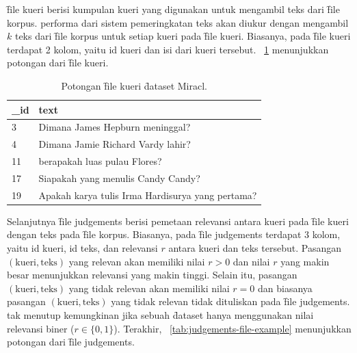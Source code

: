     \f{file} kueri berisi kumpulan kueri yang digunakan untuk mengambil teks dari \f{file} korpus. 
    performa dari sistem pemeringkatan teks akan diukur dengan mengambil $k$ teks dari \f{file} korpus untuk setiap kueri pada \f{file} kueri. Biasanya, pada \f{file} kueri terdapat 2 kolom, yaitu id kueri dan isi dari kueri tersebut. \tab~\ref{tab:query-file-example} menunjukkan potongan dari \f{file} kueri.
    \begin{table}
        \centering
        \caption{Potongan \f{file} kueri \f{dataset} Miracl.}
        \label{tab:query-file-example}
        \begin{tabular}{|l|p{}|}
            \hline
            \textbf{\_id} & \textbf{text}                                                                 \\ \hline
            3             & Dimana James Hepburn meninggal?                                              \\ \hline
            4             & Dimana Jamie Richard Vardy lahir?                                            \\ \hline
            11            & berapakah luas pulau Flores?                                                 \\ \hline
            17            & Siapakah yang menulis Candy Candy?                                           \\ \hline
            19            & Apakah karya tulis Irma Hardisurya yang pertama?                              \\ \hline
        \end{tabular}
    \end{table}
    Selanjutnya \f{file judgements} berisi pemetaan relevansi antara kueri pada \f{file} kueri dengan teks pada \f{file} korpus. Biasanya, pada \f{file} judgements terdapat 3 kolom, yaitu id kueri, id teks, dan relevansi $r$ antara kueri dan teks tersebut. Pasangan $(\text{kueri}, \text{teks})$ yang relevan akan memiliki nilai $r > 0$ dan nilai $r$ yang makin besar menunjukkan relevansi yang makin tinggi. Selain itu, pasangan $(\text{kueri}, \text{teks})$ yang tidak relevan akan memiliki nilai $r = 0$ dan biasanya pasangan $(\text{kueri}, \text{teks})$ yang tidak relevan tidak dituliskan pada \f{file judgements}. tak menutup kemungkinan jika sebuah \f{dataset} hanya menggunakan nilai relevansi biner ($r \in \{0, 1\}$). Terakhir, \tab~\ref{tab:judgements-file-example} menunjukkan potongan dari \f{file judgements}.
